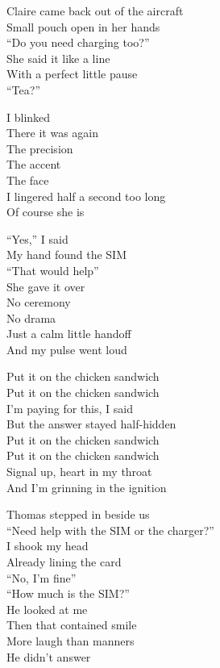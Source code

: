 \begin{lyrics}
Claire came back out of the aircraft\\
Small pouch open in her hands\\
“Do you need charging too?”\\
She said it like a line\\
With a perfect little pause\\
“Tea?”

I blinked\\
There it was again\\
The precision\\
The accent\\
The face\\
I lingered half a second too long\\
Of course she is

“Yes,” I said\\
My hand found the SIM\\
“That would help”\\
She gave it over\\
No ceremony\\
No drama\\
Just a calm little handoff\\
And my pulse went loud

Put it on the chicken sandwich\\
Put it on the chicken sandwich\\
I’m paying for this, I said\\
But the answer stayed half-hidden\\
Put it on the chicken sandwich\\
Put it on the chicken sandwich\\
Signal up, heart in my throat\\
And I’m grinning in the ignition

Thomas stepped in beside us\\
“Need help with the SIM or the charger?”\\
I shook my head\\
Already lining the card\\
“No, I’m fine”\\
“How much is the SIM?”\\
He looked at me\\
Then that contained smile\\
More laugh than manners\\
He didn’t answer


\end{lyrics}
